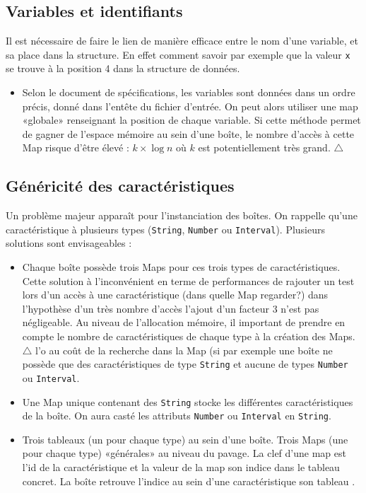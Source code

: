 
\subsection{Variables et identifiants}
Il est nécessaire de faire le lien de manière efficace entre le nom d'une variable, et sa place dans la structure. En effet comment savoir par exemple que la valeur \verb+x+ se trouve à la position 4 dans la structure de données.
\begin{itemize}
\item
  Selon le document de spécifications, les variables sont données dans un ordre précis, donné dans l'entête du fichier d'entrée. On peut alors utiliser une map «globale» renseignant la position de chaque variable. Si cette méthode permet de gagner de l'espace mémoire au sein d'une boîte, le nombre d'accès à cette Map risque d'être élevé : $k \times \log{n}$ où $k$ est potentiellement très grand. $\triangle$
\end{itemize} 

\subsection{Généricité des caractéristiques}
Un problème majeur apparaît pour l'instanciation des boîtes. On rappelle qu'une caractéristique à plusieurs types (\verb+String+, \verb+Number+ ou \verb+Interval+). Plusieurs solutions sont envisageables : 
\begin{itemize}
\item 
  Chaque boîte possède trois Maps pour ces trois types de caractéristiques. Cette solution à l'inconvénient en terme de performances de rajouter un test lors d'un accès  à une caractéristique (dans quelle Map regarder?) dans l'hypothèse d'un très nombre d'accès l'ajout d'un facteur 3 n'est pas négligeable. Au niveau de l'allocation mémoire, il important de prendre en compte le nombre de caractéristiques de chaque type à la création des Maps.  $\triangle$ l'o au coût de la recherche dans la Map  (si par exemple une boîte ne possède que des caractéristiques de type \verb+String+ et aucune de types \verb+Number+ ou \verb+Interval+. 
\item
  Une Map unique contenant des \verb+String+ stocke les différentes caractéristiques de la boîte. On aura casté les attributs \verb+Number+ ou \verb+Interval+ en \verb+String+.
\item 
Trois tableaux (un pour chaque type) au sein d'une boîte. Trois Maps (une pour chaque type) «générales» au niveau du pavage. La clef d'une map est l'id de la caractéristique et la valeur de la map son indice dans le tableau concret. La boîte retrouve l'indice au sein d'une caractéristique son tableau .

\end{itemize}


